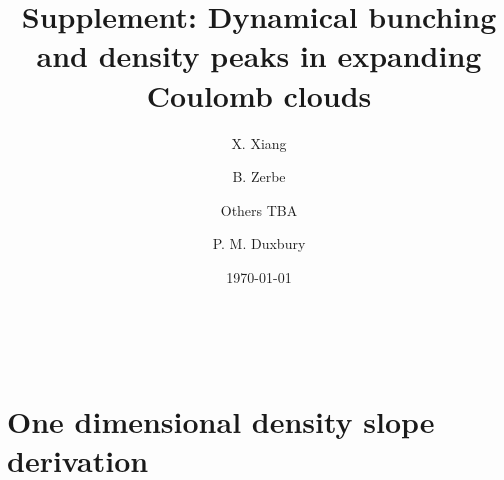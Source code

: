 \documentclass[aps,prl,twocolumn,showpacs,superscriptaddress,groupedaddress]{revtex4-1}  %
\begin{document}
\title{Supplement: Dynamical bunching and density peaks in expanding Coulomb clouds}
\author{X. Xiang}\email{}
\author{B. Zerbe}
\author{Others TBA}
\author{P. M. Duxbury}


\date{\today}

\newcommand{\vect}[1]{\boldsymbol{#1}}​
\maketitle

\section{One dimensional density slope derivation}
\end{document}
